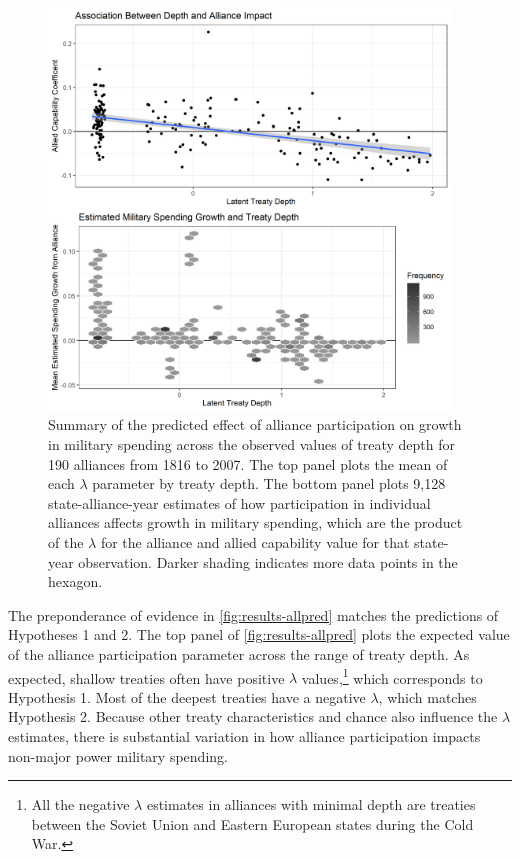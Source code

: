 \documentclass[12pt]{article}
\begin{document}
\begin{figure}[htbp]
	\centering
		\includegraphics[width=0.95\textwidth]{../figures/results-allpred.png}
	\caption{Summary of the predicted effect of alliance participation on growth in military spending across the observed values of treaty depth for 190 alliances from 1816 to 2007. The top panel plots the mean of each $\lambda$ parameter by treaty depth. The bottom panel plots 9,128 state-alliance-year estimates of how participation in individual alliances affects growth in military spending, which are the product of the $\lambda$ for the alliance and allied capability value for that state-year observation. Darker shading indicates more data points in the hexagon.}
	\label{fig:results-allpred}
\end{figure}


The preponderance of evidence in \autoref{fig:results-allpred} matches the predictions of Hypotheses 1 and 2.
The top panel of \autoref{fig:results-allpred} plots the expected value of the alliance participation parameter across the range of treaty depth. 
As expected, shallow treaties often have positive $\lambda$ values,\footnote{All the negative $\lambda$ estimates in alliances with minimal depth are treaties between the Soviet Union and Eastern European states during the Cold War.} which corresponds to Hypothesis 1. 
Most of the deepest treaties have a negative $\lambda$, which matches Hypothesis 2. 
Because other treaty characteristics and chance also influence the $\lambda$ estimates, there is substantial variation in how alliance participation impacts non-major power military spending. 
\end{document}
